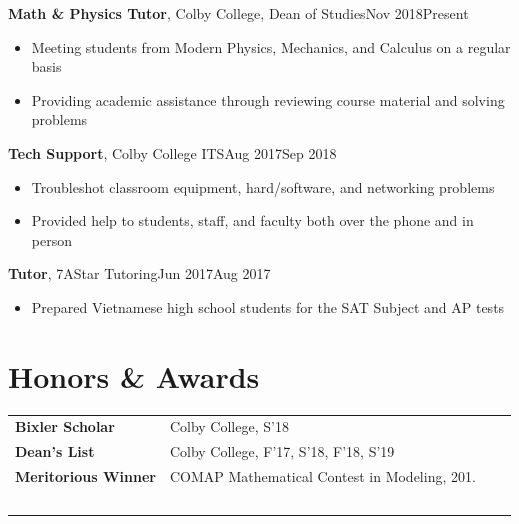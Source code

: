 \documentclass[a4paper, 9pt]{article}
\begin{document}
	\indent \indent \textbf{Math \& Physics Tutor}, {Colby College, Dean of Studies}\hfill Nov 2018\textemdash Present
	\begin{itemize}[noitemsep, nolistsep]
		\setlength{\itemindent}{0.2in}
		\item Meeting students from Modern Physics, Mechanics, and Calculus on a regular basis
		\item Providing academic assistance through reviewing course material and solving problems
	\end{itemize}
	\indent \indent  \textbf{Tech Support}, {Colby College ITS}\hfill Aug 2017\textemdash Sep 2018
	\begin{itemize}[noitemsep, nolistsep]
		\setlength{\itemindent}{0.2in}
		\item Troubleshot classroom equipment, hard/software, and networking problems
		\item Provided help to students, staff, and faculty both over the phone and in person
	\end{itemize}
	\indent \indent \textbf{Tutor}, {7AStar Tutoring}\hfill Jun 2017\textemdash Aug 2017
	\begin{itemize}[noitemsep, nolistsep]
		\setlength{\itemindent}{0.2in}
		\item Prepared Vietnamese high school students for the SAT Subject and AP tests\\
	\end{itemize}

	\section*{\normalsize{{\color{colby}Honors \& Awards}}}
	\begin{tabular}{lp{13.5cm}lp{2in}}
		\textbf{Bixler Scholar} & {Colby College}, S'18\textemdash \\
		\textbf{Dean's List} & {Colby College}, F'17, S'18, F'18, S'19\\
		\textbf{Meritorious Winner} & {COMAP} Mathematical Contest in Modeling, 201. \\
		$\,$
	\end{tabular}
	
\end{document}
